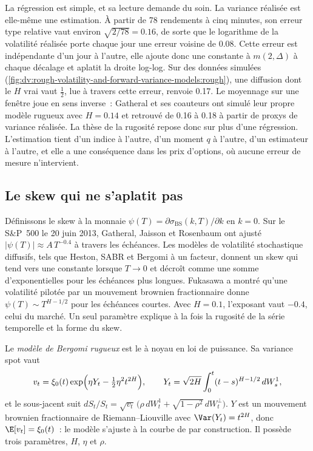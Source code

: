 La régression est simple, et sa lecture demande du soin. La variance réalisée est elle-même une estimation. À partir de 78
rendements à cinq minutes, son erreur type relative vaut environ $\sqrt{2/78}=0.16$, de sorte que le logarithme de la
volatilité réalisée porte chaque jour une erreur voisine de 0.08. Cette erreur est indépendante d'un jour à l'autre, elle
ajoute donc une constante à $m(2,\Delta)$ à chaque décalage et aplatit la droite log-log. Sur des données simulées
(\cref{fig:dv:rough-volatility-and-forward-variance-models:rough}), une diffusion dont le $H$ vrai vaut $\frac12$, lue à travers
cette erreur, renvoie 0.17. Le moyennage sur une fenêtre joue en sens inverse~: Gatheral et ses
coauteurs ont simulé leur propre modèle rugueux avec $H=0.14$ et retrouvé de 0.16 à 0.18 à partir de
proxys de variance réalisée. La thèse de la rugosité repose donc sur plus d'une régression. L'estimation tient
d'un indice à l'autre, d'un moment $q$ à l'autre, d'un estimateur à l'autre, et elle a une conséquence dans
les prix d'options, où aucune erreur de mesure n'intervient.

\subsection{Le skew qui ne s'aplatit pas}

Définissons le skew à la monnaie $\psi(T)=\partial\sigma_{\mathrm{BS}}(k,T)/\partial k$ en $k=0$. Sur le S\&P~500
le 20 juin 2013, Gatheral, Jaisson et Rosenbaum ont ajusté $|\psi(T)|\approx A\,T^{-0.4}$ à travers les échéances.
Les modèles de volatilité stochastique diffusifs, tels que Heston, SABR et Bergomi à un facteur, donnent un skew qui tend vers une
constante lorsque $T\to0$ et décroît comme une somme d'exponentielles pour les échéances plus longues. Fukasawa a montré
qu'une volatilité pilotée par un mouvement brownien fractionnaire donne $\psi(T)\sim T^{H-1/2}$ pour les échéances courtes. Avec
$H=0.1$, l'exposant vaut $-0.4$, celui du marché. Un seul paramètre explique à la fois la rugosité de la série temporelle
et la forme du skew.

\begin{definition}\label{def:dv:rough-volatility-and-forward-variance-models:rbergomi}
Le \emph{modèle de Bergomi rugueux} est le  à noyau en
loi de puissance. Sa variance spot vaut
\[
v_t=\xi_0(t)\exp\Bigl(\eta Y_t-\tfrac12\eta^2t^{2H}\Bigr),\qquad Y_t=\sqrt{2H}\int_0^t(t-s)^{H-1/2}\,dW^1_s,
\]
et le sous-jacent suit $dS_t/S_t=\sqrt{v_t}\,\bigl(\rho\,dW^1_t+\sqrt{1-\rho^2}\,dW^\perp_t\bigr)$. $Y$
est un mouvement brownien fractionnaire de Riemann--Liouville avec $\Var(Y_t)=t^{2H}$, donc $\E[v_t]=\xi_0(t)$~: le modèle
s'ajuste à la courbe de  par construction. Il possède trois paramètres, $H$, $\eta$ et $\rho$.
\end{definition}

